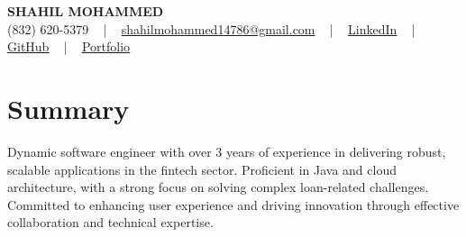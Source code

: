 \documentclass[letterpaper,10pt]{article}
\begin{document}
\begin{center}
    {\fontsize{14pt}{12pt}\selectfont \textbf{\MakeUppercase{Shahil Mohammed}}}\\ \vspace{2pt}
    \fontsize{10pt}{12pt}\selectfont (832) 620-5379 ~ | ~ \href{mailto:shahilmohammed14786@gmail.com}{shahilmohammed14786@gmail.com} ~ | ~  
    \href{https://www.linkedin.com/in/shahil-mohammed-9652931a1/}{\color{blue}\underline{LinkedIn}}  ~ | ~ 
    \href{https://github.com/freakbeast14}{\color{blue}\underline{GitHub}} ~ | ~ 
    \href{https://shahil-mohammed.netlify.app/}{\color{blue}\underline{Portfolio}}
    \vspace{-8pt}
\end{center}

\section{Summary}
\vspace{-2pt}\fontsize{8pt}{9pt}\selectfont
Dynamic software engineer with over 3 years of experience in delivering robust, scalable applications in the fintech sector. Proficient in Java and cloud architecture, with a strong focus on solving complex loan-related challenges. Committed to enhancing user experience and driving innovation through effective collaboration and technical expertise.
 \vspace{-5pt}
 
\vspace{-2pt}
\end{document}
